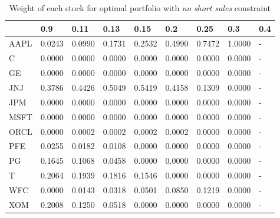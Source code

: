 \documentclass[a4paper,11pt,twoside]{article}
\begin{document}
\begin{center} %
\begin{table}[H]
\centering
\begin{tabular}{| l | llllllll |}
\hline
& 0.9  & 0.11   & 0.13   & 0.15   & 0.2    & 0.25   & 0.3    & 0.4 \\
\hline
\hline
AAPL & 0.0243 & 0.0990 & 0.1731 & 0.2532 & 0.4990 & 0.7472 & 1.0000 & - \\
C    & 0.0000 & 0.0000 & 0.0000 & 0.0000 & 0.0000 & 0.0000 & 0.0000 & - \\
GE   & 0.0000 & 0.0000 & 0.0000 & 0.0000 & 0.0000 & 0.0000 & 0.0000 & - \\
JNJ  & 0.3786 & 0.4426 & 0.5049 & 0.5419 & 0.4158 & 0.1309 & 0.0000 & - \\
JPM  & 0.0000 & 0.0000 & 0.0000 & 0.0000 & 0.0000 & 0.0000 & 0.0000 & - \\
MSFT & 0.0000 & 0.0000 & 0.0000 & 0.0000 & 0.0000 & 0.0000 & 0.0000 & - \\
ORCL & 0.0000 & 0.0002 & 0.0002 & 0.0002 & 0.0002 & 0.0000 & 0.0000 & - \\
PFE  & 0.0255 & 0.0182 & 0.0108 & 0.0000 & 0.0000 & 0.0000 & 0.0000 & - \\
PG   & 0.1645 & 0.1068 & 0.0458 & 0.0000 & 0.0000 & 0.0000 & 0.0000 & - \\
T    & 0.2064 & 0.1939 & 0.1816 & 0.1546 & 0.0000 & 0.0000 & 0.0000 & - \\
WFC  & 0.0000 & 0.0143 & 0.0318 & 0.0501 & 0.0850 & 0.1219 & 0.0000 & - \\
XOM  & 0.2008 & 0.1250 & 0.0518 & 0.0000 & 0.0000 & 0.0000 & 0.0000 & -\\ 
\hline
\end{tabular}\label{table_no_short}
\caption{Weight of each stock for optimal portfolio with \emph{no short sales} constraint}
\end{table}
\end{center}
\end{document}
